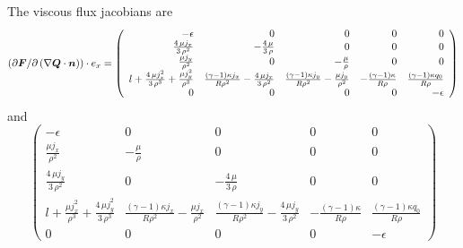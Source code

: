 The viscous flux jacobians are
\begin{equation}
\left( \partial \bm{F}/\partial \left( \nabla \bm{Q} \cdot \bm{n} \right)\right) \cdot e_x =  \left(\begin{array}{rrrrr}
-\epsilon & 0 & 0 & 0 & 0 \\
\frac{4 \, \mu j_{x}}{3 \, \rho^{2}} & -\frac{4 \, \mu}{3 \, \rho} & 0 & 0 & 0 \\
\frac{\mu j_{y}}{\rho^{2}} & 0 & -\frac{\mu}{\rho} & 0 & 0 \\
l + \frac{4 \, \mu j_{x}^{2}}{3 \, \rho^{3}} + \frac{\mu j_{y}^{2}}{\rho^{3}} & \frac{{\left(\gamma - 1\right)} \kappa j_{x}}{R \rho^{2}} - \frac{4 \, \mu j_{x}}{3 \, \rho^{2}} & \frac{{\left(\gamma - 1\right)} \kappa j_{y}}{R \rho^{2}} - \frac{\mu j_{y}}{\rho^{2}} & -\frac{{\left(\gamma - 1\right)} \kappa}{R \rho} & \frac{{\left(\gamma - 1\right)} \kappa q_{0}}{R \rho} \\
0 & 0 & 0 & 0 & -\epsilon
\end{array}\right)
\end{equation}
and
\begin{equation}
  \left(\begin{array}{rrrrr}
-\epsilon & 0 & 0 & 0 & 0 \\
\frac{\mu j_{x}}{\rho^{2}} & -\frac{\mu}{\rho} & 0 & 0 & 0 \\
\frac{4 \, \mu j_{y}}{3 \, \rho^{2}} & 0 & -\frac{4 \, \mu}{3 \, \rho} & 0 & 0 \\
l + \frac{\mu j_{x}^{2}}{\rho^{3}} + \frac{4 \, \mu j_{y}^{2}}{3 \, \rho^{3}} & \frac{{\left(\gamma - 1\right)} \kappa j_{x}}{R \rho^{2}} - \frac{\mu j_{x}}{\rho^{2}} & \frac{{\left(\gamma - 1\right)} \kappa j_{y}}{R \rho^{2}} - \frac{4 \, \mu j_{y}}{3 \, \rho^{2}} & -\frac{{\left(\gamma - 1\right)} \kappa}{R \rho} & \frac{{\left(\gamma - 1\right)} \kappa q_{0}}{R \rho} \\
0 & 0 & 0 & 0 & -\epsilon
\end{array}\right)
\end{equation}
